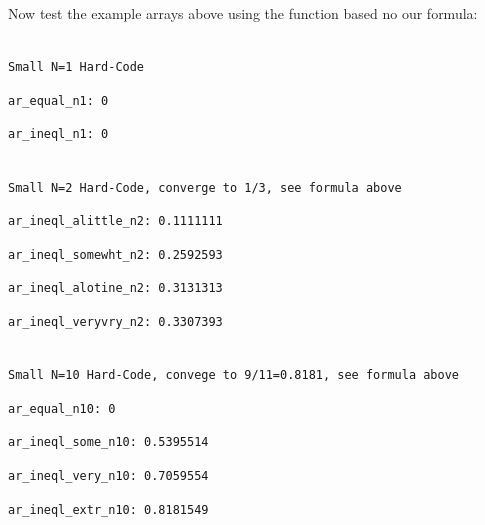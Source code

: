 \documentclass[
]{book}
\begin{document}
Now test the example arrays above using the function based no our formula:

\begin{verbatim}

Small N=1 Hard-Code
\end{verbatim}

\begin{verbatim}
ar_equal_n1: 0 
\end{verbatim}

\begin{verbatim}
ar_ineql_n1: 0 
\end{verbatim}

\begin{verbatim}

Small N=2 Hard-Code, converge to 1/3, see formula above
\end{verbatim}

\begin{verbatim}
ar_ineql_alittle_n2: 0.1111111 
\end{verbatim}

\begin{verbatim}
ar_ineql_somewht_n2: 0.2592593 
\end{verbatim}

\begin{verbatim}
ar_ineql_alotine_n2: 0.3131313 
\end{verbatim}

\begin{verbatim}
ar_ineql_veryvry_n2: 0.3307393 
\end{verbatim}

\begin{verbatim}

Small N=10 Hard-Code, convege to 9/11=0.8181, see formula above
\end{verbatim}

\begin{verbatim}
ar_equal_n10: 0 
\end{verbatim}

\begin{verbatim}
ar_ineql_some_n10: 0.5395514 
\end{verbatim}

\begin{verbatim}
ar_ineql_very_n10: 0.7059554 
\end{verbatim}

\begin{verbatim}
ar_ineql_extr_n10: 0.8181549 
\end{verbatim}
\end{document}
